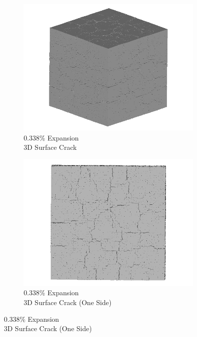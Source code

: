 \begin{figure}[ht!]
    \begin{subfigure}{.5\textwidth}
      \centering
      \includegraphics[width=0.5\linewidth]{Files/exp_3D/DEF/A30X-5C_2_3d.png}
      \caption{0.338\% Expansion\\3D Surface Crack}
    \end{subfigure}%
    \begin{subfigure}{.5\textwidth}
      \centering
      \includegraphics[width=0.5\linewidth]{Files/exp_3D/DEF/A30X-5C_2_3ds.png}
      \caption{0.338\% Expansion\\3D Surface Crack (One Side)}
    \end{subfigure}%


\end{figure}
